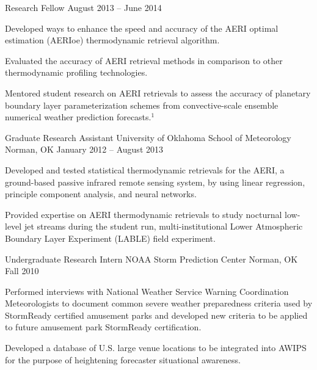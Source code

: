\begin{cventries}
  \cventry
    {Research Fellow} %
    {} %
    {} %
    {August 2013 -- June 2014} %
    {
      \begin{cvitems} %
        \item {Developed ways to enhance the speed and accuracy of the AERI optimal estimation (AERIoe) thermodynamic retrieval algorithm.}
        \item {Evaluated the accuracy of AERI retrieval methods in comparison to other thermodynamic profiling technologies.}
        \item {Mentored student research on AERI retrievals to assess the accuracy of planetary boundary layer parameterization schemes from convective-scale ensemble numerical weather prediction forecasts.$^{1}$}
      \end{cvitems}
    }

  \cventry
    {Graduate Research Assistant} %
    {University of Oklahoma School of Meteorology} %
    {Norman, OK} %
    {January 2012 -- August 2013} %
    {
      \begin{cvitems} %
        \item {Developed and tested statistical thermodynamic retrievals for the AERI, a ground-based passive infrared remote sensing system, by using linear regression, principle component analysis, and neural networks.}
		\item {Provided expertise on AERI thermodynamic retrievals to study nocturnal low-level jet streams during the student run, multi-institutional Lower Atmospheric Boundary Layer Experiment (LABLE) field experiment.}
      \end{cvitems}
    }

  \cventry
    {Undergraduate Research Intern} %
    {NOAA Storm Prediction Center} %
    {Norman, OK} %
    {Fall 2010} %
    {
      \begin{cvitems} %
        \item {Performed interviews with National Weather Service Warning Coordination Meteorologists to document common severe weather preparedness criteria used by StormReady certified amusement parks and developed new criteria to be applied to future amusement park StormReady certification.}
		\item {Developed a database of U.S. large venue locations to be integrated into AWIPS for the purpose of heightening forecaster situational awareness.}
      \end{cvitems}
    }

\end{cventries}
